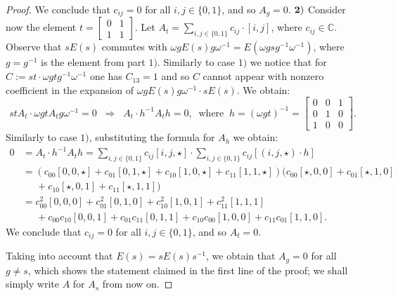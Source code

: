 \documentclass[10pt,a4paper]{amsart}
\begin{document}
\begin{proof}
   We conclude that $c_{ij}=0$ for all  $i,j\in\{0,1\}$, and so $A_g=0$.
\vskip 0.1cm\noindent
${\bf 2)}$  Consider now the element $t=\begin{bmatrix}
	0&1\\1&1
\end{bmatrix}$. Let $A_t=\sum\limits_{i,j\in\{0,1\}}c_{ij}\cdot [i,j]$, where $c_{ij}\in\mathbb C$. Observe that $sE(s)$ commutes with $\omega gE(s)g\omega^{-1}=E(\omega gsg^{-1}\omega^{-1})$, where $g=g^{-1}$ is the element from part $1)$. Similarly to case $1)$ we notice that for $C:=st\cdot \omega gtg^{-1}\omega^{-1}$ one has $C_{13}=1$ and so $C$ cannot appear with nonzero coefficient in the expansion of $\omega gE(s)g\omega^{-1}\cdot sE(s)$. We obtain:
$$stA_t\cdot \omega gtA_tg\omega^{-1}=0\;\;\Longrightarrow\;\; A_t\cdot h^{-1} A_th=0,\;\;\text{where}\;\; h=(\omega gt)^{-1}=\begin{bmatrix}
	0&0&1\\0&1&0\\1&0&0
\end{bmatrix}.$$ 
Similarly to case $1)$, substituting the formula for $A_h$ we obtain:
\begin{align*}0&=A_t\cdot h^{-1} A_th=\sum\limits_{i,j\in\{0,1\}}c_{ij}[i,j,\star]\cdot\sum\limits_{i,j\in\{0,1\}}c_{ij}[(i,j,\star)\cdot h]\\&=
	(c_{00}[0,0,\star]+c_{01}[0,1,\star]+c_{10}[1,0,\star]+c_{11}[1,1,\star])(c_{00}[\star,0,0]+c_{01}[\star,1,0]\\& \;\;\;\;\;+c_{10}[\star,0,1]+c_{11}[\star,1,1])\\&=
	c_{00}^2[0,0,0]+c_{01}^2[0,1,0]+c_{10}^2[1,0,1]+c_{11}^2[1,1,1]
    \\& \;\;\;\;\;+c_{00}c_{10}[0,0,1]+c_{01}c_{11}[0,1,1]+c_{10}c_{00}[1,0,0]+c_{11}c_{01}[1,1,0].\end{align*}
    We conclude that $c_{ij}=0$ for all  $i,j\in\{0,1\}$, and so $A_t=0$.

\smallskip
 Taking into account that $E(s)=sE(s)s^{-1}$, we obtain that $A_g=0$ for all $g\neq s$, which shows the statement claimed in the first line of the proof; we shall simply write $A$ for $A_s$ from now on.
\smallskip 
 

\end{proof}
\end{document}
